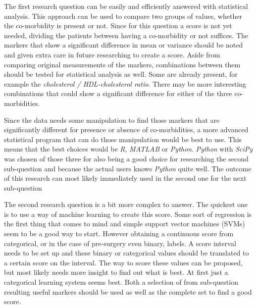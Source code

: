 \documentclass[10pt,a4paper]{report}
\begin{document}
	The first research question can be easily and efficiently answered with statistical analysis. This approach can be used to compare two groups of values, whether the co-morbidity is present or not. Since for this question a score is not yet needed, dividing the patients between having a co-morbidity or not suffices. The markers that show a significant difference in mean or variance should be noted and given extra care in future researching to create a score. Aside from comparing original measurements of the markers, combinations between them should be tested for statistical analysis as well. Some are already present, for example the \textit{cholesterol / HDL-cholesterol ratio}. There may be more interesting combinations that could show a significant difference for either of the three co-morbidities.
	
	Since the data needs some manipulation to find those markers that are significantly different for presence or absence of co-morbidities, a more advanced statistical program that can do those manipulation would be best to use. This means that the best choices would be \textit{R}, \textit{MATLAB} or \textit{Python}. \textit{Python} with \textit{SciPy} was chosen of those three for also being a good choice for researching the second sub-question and because the actual users knows \textit{Python} quite well. The outcome of this research can most likely immediately used in the second one for the next sub-question
	
	The second research question is a bit more complex to answer. The quickest one is to use a way of machine learning to create this score. Some sort of regression is the first thing that comes to mind and simple support vector machines (SVMs) seem to be a good way to start. However obtaining a continuous score from categorical, or in the case of pre-surgery even binary, labels. A score interval needs to be set up and these binary or categorical values should be translated to a certain score on the interval. The way to score these values can be proposed, but most likely needs more insight to find out what is best. At first just a categorical learning system seems best. Both a selection of from sub-question resulting useful markers should be used as well as the complete set to find a good score.
	
	
\end{document}
